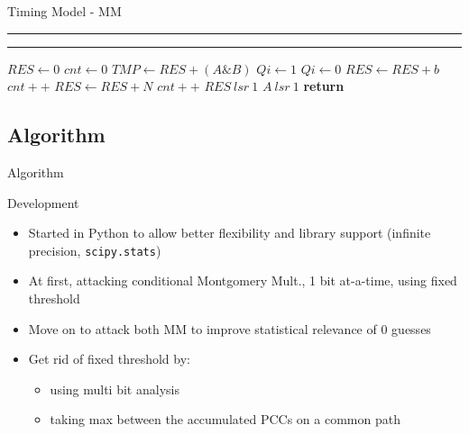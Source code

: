 \documentclass[aspectratio=43]{beamer}
\begin{document}
\begin{frame}[allowframebreaks]{Timing Model - MM}
  \scriptsize
  \rule{\textwidth}{0.5pt}
  \vspace*{-0.2cm}
  \rule{\textwidth}{0.5pt}%
  \vspace*{0.2cm}
  \begin{center}
    \begin{algorithmic}[1]
        \State $RES \gets 0$
        \State $cnt \gets 0$
          \State $TMP\gets RES + (A\&B)$
            \State $Qi\gets 1$
          \Else
            \State $Qi\gets 0$
          \EndIf
            \State $RES \gets RES + b $
            \State $cnt++$
          \EndIf
            \State $RES \gets RES + N $
            \State $cnt++$
          \EndIf
          \State $RES \: lsr \: 1$
          \State $A \: lsr \: 1$
        \EndFor
        \State \textbf{return}
      \EndProcedure
    \end{algorithmic}
  \end{center}
\end{frame}


\subsection{Algorithm}

\begin{frame}{Algorithm}
    \begin{block}{Development}
        \begin{itemize}
            \pause \item Started in Python to allow better flexibility and library support (infinite precision, \texttt{scipy.stats})
            \pause \item At first, attacking conditional Montgomery Mult., 1 bit at-a-time, using fixed threshold
            \pause \item Move on to attack both MM to improve statistical relevance of 0 guesses
            \pause \item Get rid of fixed threshold by:
            \begin{itemize}
              \item using multi bit analysis
              \item taking max between the accumulated PCCs on a common path
            \end{itemize}
        \end{itemize}
    \end{block}
\end{frame}
\end{document}
